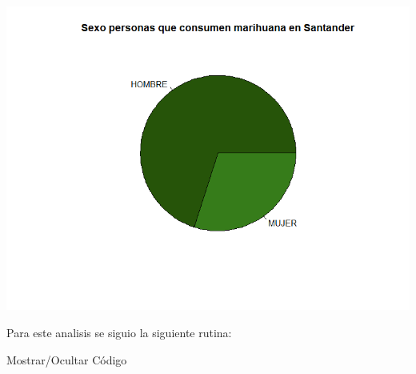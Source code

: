 \documentclass[
]{article}
\begin{document}
\includegraphics{images/marihuana S santander.png}

Para este analisis se siguio la siguiente rutina:

Mostrar/Ocultar Código
\end{document}
